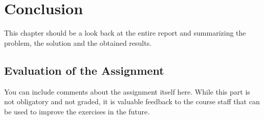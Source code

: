 \chapter{Conclusion}
This chapter should be a look back at the entire report and summarizing the problem, the solution and the obtained results.

\section{Evaluation of the Assignment}
You can include comments about the assignment itself here. While this part is not obligatory and not graded, it is valuable feedback to the course staff that can be used to improve the exercises in the future.